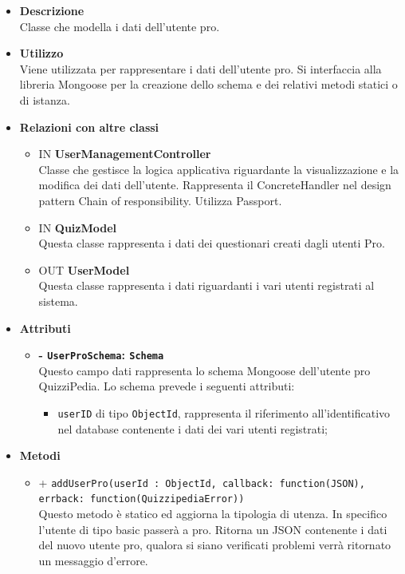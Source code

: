 \begin{itemize}
	\item \textbf{Descrizione} \\
	Classe che modella i dati dell'utente pro.
	\item \textbf{Utilizzo} \\
	Viene utilizzata per rappresentare i dati dell'utente pro. Si interfaccia alla libreria Mongoose per la creazione dello schema e dei relativi metodi statici o di istanza.
	\item \textbf{Relazioni con altre classi} 
		\begin{itemize}
			\item IN \textbf {UserManagementController} \\
			Classe che gestisce la logica applicativa riguardante la visualizzazione e la modifica dei dati dell'utente.
Rappresenta il ConcreteHandler nel design pattern Chain of responsibility. Utilizza Passport.
			\item IN \textbf{QuizModel} \\
			Questa classe rappresenta i dati dei questionari creati dagli utenti Pro.
			\item OUT \textbf{UserModel} \\
			Questa classe rappresenta i dati riguardanti i vari utenti registrati al sistema.
		\end{itemize}
	\item \textbf{Attributi} 
		\begin{itemize}
			\item \textbf{- \texttt{UserProSchema}: \texttt{Schema}} \\
			Questo campo dati rappresenta lo schema Mongoose dell'utente pro QuizziPedia. Lo schema prevede i seguenti attributi:
			\begin{itemize}
				\item 
					\texttt{userID} di tipo \texttt{ObjectId}, rappresenta il riferimento all'identificativo nel database contenente i dati dei vari utenti registrati;
			\end{itemize}		
		\end{itemize}	
	\item \textbf{Metodi}
		\begin{itemize}
		\item
		+ \texttt{addUserPro(userId : ObjectId, callback: function(JSON), errback: function(QuizzipediaError))} \\	
		Questo metodo è statico ed aggiorna la tipologia di utenza. In specifico l'utente di tipo basic passerà a pro. Ritorna un JSON contenente i dati del nuovo utente pro, qualora si siano verificati problemi verrà ritornato un messaggio d'errore.	\\	

\end{itemize}
\end{itemize}

